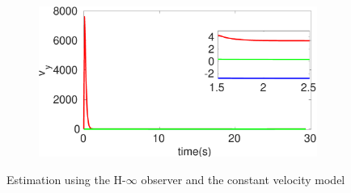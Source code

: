 \begin{figure}[!h]
\begin{subfigure}{.5\linewidth}
\end{subfigure}
\begin{subfigure}{.5\linewidth}
\centering
\includegraphics[width=\linewidth]{figures/HInf/s3cvHInfv_y}
\end{subfigure}
\caption{Estimation using the H-$\infty$ observer and the constant velocity model}
\end{figure}

